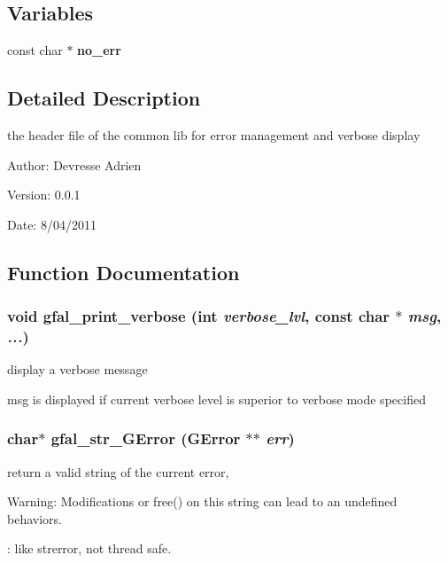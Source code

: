 \subsection*{Variables}
\begin{CompactItemize}
\item 
const char $\ast$ \textbf{no\_\-err}\label{gfal__common__errverbose_8h_cc06ff0911bcca4df46746f73337cab2}

\end{CompactItemize}


\subsection{Detailed Description}
the header file of the common lib for error management and verbose display 

\begin{Desc}
\item[Author:]Devresse Adrien \end{Desc}
\begin{Desc}
\item[Version:]0.0.1 \end{Desc}
\begin{Desc}
\item[Date:]8/04/2011 \end{Desc}


\subsection{Function Documentation}
\subsubsection{\setlength{\rightskip}{0pt plus 5cm}void gfal\_\-print\_\-verbose (int {\em verbose\_\-lvl}, const char $\ast$ {\em msg},  {\em ...})}\label{gfal__common__errverbose_8h_8b05640b4b43a776603bd93703c29d30}


display a verbose message 

msg is displayed if current verbose level is superior to verbose mode specified 
\subsubsection{\setlength{\rightskip}{0pt plus 5cm}char$\ast$ gfal\_\-str\_\-GError (GError $\ast$$\ast$ {\em err})}\label{gfal__common__errverbose_8h_c35c45ff43533cc6e7c176b0fa0b3128}


return a valid string of the current error, \begin{Desc}
\item[Warning:]Modifications or free() on this string can lead to an undefined behaviors. 

: like strerror, not thread safe. \end{Desc}
